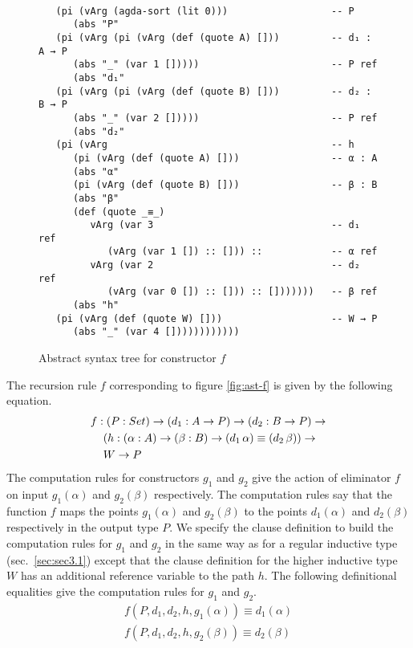 \documentclass[sigplan,10pt]{acmart}
\begin{document}
\begin{figure}
\begin{center}
\begingroup
\fontsize{7pt}{9pt}\selectfont
\begin{Verbatim}[frame = single]

   (pi (vArg (agda-sort (lit 0)))                  -- P
      (abs "P"
   (pi (vArg (pi (vArg (def (quote A) []))         -- d₁ : A → P
      (abs "_" (var 1 []))))                       -- P ref
      (abs "d₁"
   (pi (vArg (pi (vArg (def (quote B) []))         -- d₂ : B → P
      (abs "_" (var 2 []))))                       -- P ref
      (abs "d₂"
   (pi (vArg                                       -- h
      (pi (vArg (def (quote A) []))                -- α : A
      (abs "α"
      (pi (vArg (def (quote B) []))                -- β : B
      (abs "β"
      (def (quote _≡_)
         vArg (var 3                               -- d₁ ref
            (vArg (var 1 []) :: [])) ::            -- α ref
         vArg (var 2                               -- d₂ ref
            (vArg (var 0 []) :: [])) :: []))))))   -- β ref
      (abs "h"
   (pi (vArg (def (quote W) []))                   -- W → P
      (abs "_" (var 4 [])))))))))))

\end{Verbatim}
\endgroup
\end{center}
\caption{Abstract syntax tree for constructor $f$}
\label{fig:ast-f}
\end{figure}

The recursion rule $f$ corresponding to figure \eqref{fig:ast-f} is given by the following equation.
\begin{align}
& f : (P : Set) \rightarrow (d_1 : A \rightarrow P) \rightarrow (d_2 : B \rightarrow P) \rightarrow \nonumber \\
& \hspace {0.4cm} (h : (\alpha : A) \rightarrow (\beta : B) \rightarrow (d_1 \, \alpha) \equiv (d_2 \, \beta)) \rightarrow \nonumber \\
& \hspace {0.4cm} W \rightarrow P \nonumber
\end{align}
The computation rules for constructors $g_1$ and $g_2$ give the action of eliminator $f$ on input $g_1 (\alpha)$ and $g_2 (\beta)$ respectively. The computation rules say that the function $f$ maps the points $g_1 (\alpha)$ and $g_2 (\beta)$ to the points $d_1 (\alpha)$ and $d_2 (\beta)$ respectively in the output type $P$. We specify the clause definition to build the computation rules for $g_1$ and $g_2$ in the same way as for a regular inductive type (sec.~\ref{sec:sec3.1}) except that the clause definition for the higher inductive type $W$ has an additional reference variable to the path $h$. The following definitional equalities give the computation rules for $g_1$ and $g_2$.
\begin{align}
f (P, d_1, d_2, h, g_1 (\alpha)) \equiv d_1 (\alpha) \nonumber \\
f (P, d_1, d_2, h, g_2 (\beta)) \equiv d_2 (\beta) \nonumber
\end{align}
\end{document}
